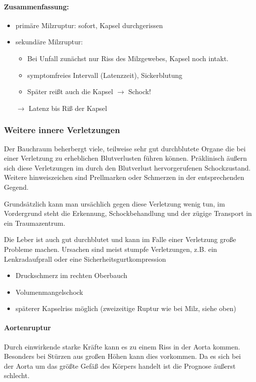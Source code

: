 \paragraph{Zusammenfassung:}
\begin{itemize}
  \item primäre Milzruptur: sofort, Kapsel durchgerissen
  \item sekundäre Milzruptur:
  \begin{itemize}
    \item Bei Unfall zunächst nur Riss des Milzgewebes, Kapsel noch intakt.
    \item symptomfreies Intervall (Latenzzeit), Sickerblutung
    \item Später reißt auch die Kapsel  ${\rightarrow}$ Schock!
  \end{itemize}
  ${\rightarrow}$ Latenz bis Riß der Kapsel
\end{itemize}




\subsubsection{Weitere innere Verletzungen}

Der Bauchraum beherbergt viele, teilweise sehr gut
durchblutete Organe die bei einer Verletzung zu erheblichen
Blutverlusten führen können. Präklinisch äußern sich diese
Verletzungen im durch den Blutverlust hervorgerufenen
Schockzustand. Weitere hinweiszeichen sind Prellmarken oder
Schmerzen in der entsprechenden Gegend.

Grundsätzlich kann man ursächlich gegen diese Verletzung
wenig tun, im Vordergrund steht die Erkennung,
Schockbehandlung und der zügige Transport in ein
Traumazentrum.


{
Die Leber ist auch gut durchblutet und kann im Falle einer Verletzung große
Probleme machen. Ursachen sind meist stumpfe Verletzungen, z.B. ein
Lenkradaufprall oder eine Sicherheitsgurtkompression
}{
\begin{itemize}
  \item Druckschmerz im rechten Oberbauch
  \item Volumenmangelschock
  \item späterer Kapselriss möglich (zweizeitige Ruptur wie bei Milz, siehe oben)
\end{itemize}
}

\paragraph{Aortenruptur}\label{topic:aortenruptur}Durch
einwirkende starke Kräfte kann es zu einem Riss in der Aorta
kommen. Besonders bei Stürzen aus großen Höhen kann dies
vorkommen. Da es sich bei der Aorta um das größte Gefäß des
Körpers handelt ist die Prognose äußerst schlecht.


